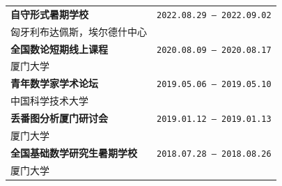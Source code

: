 \begin{tabularx}{\textwidth}{@{}Xr@{}}  %

\textbf{自守形式暑期学校} & \texttt{2022.08.29 -- 2022.09.02} \\
匈牙利布达佩斯，埃尔德什中心 & \\[0.6ex]

\textbf{全国数论短期线上课程} & \texttt{2020.08.09 -- 2020.08.17} \\
厦门大学 & \\[0.6ex]

\textbf{青年数学家学术论坛} & \texttt{2019.05.06 -- 2019.05.10} \\
中国科学技术大学 & \\[0.6ex]

\textbf{丢番图分析厦门研讨会} & \texttt{2019.01.12 -- 2019.01.13} \\
厦门大学 & \\[0.6ex]

\textbf{全国基础数学研究生暑期学校} & \texttt{2018.07.28 -- 2018.08.26} \\
厦门大学 & \\

\end{tabularx}